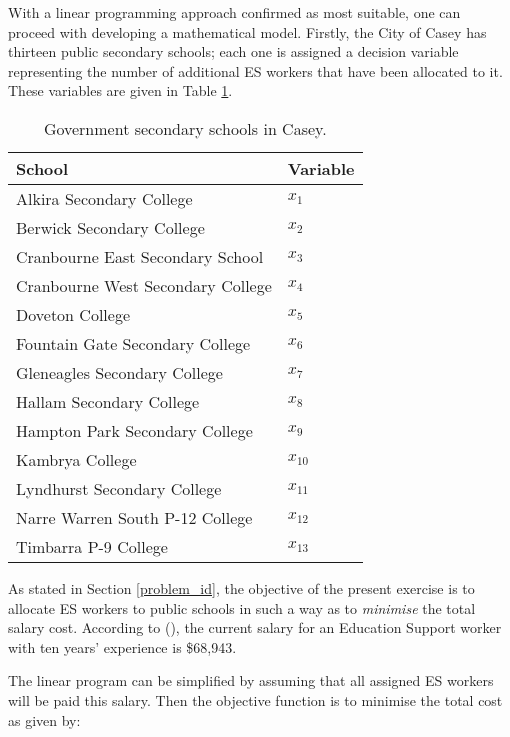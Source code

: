 \documentclass[11pt, a4paper]{article}
\begin{document}
    With a linear programming approach confirmed as most suitable, one can proceed with developing a mathematical model. Firstly, the City of Casey has thirteen public secondary schools; each one is assigned a decision variable representing the number of additional ES workers that have been allocated to it. These variables are given in Table \ref{dec_vars}.

    \begin{table}[!ht]
        \centering
        \caption{Government secondary schools in Casey.}
        \begin{tabular}{|l|l|}
            \hline
            School & Variable \\ \hline
            Alkira Secondary College & $x_1$ \\ \hline
            Berwick Secondary College & $x_2$ \\ \hline
            Cranbourne East Secondary School & $x_3$ \\ \hline
            Cranbourne West Secondary College & $x_4$ \\ \hline
            Doveton College & $x_5$ \\ \hline
            Fountain Gate Secondary College & $x_6$ \\ \hline
            Gleneagles Secondary College & $x_7$ \\ \hline
            Hallam Secondary College & $x_8$ \\ \hline
            Hampton Park Secondary College & $x_9$ \\ \hline
            Kambrya College & $x_{10}$ \\ \hline
            Lyndhurst Secondary College & $x_{11}$ \\ \hline
            Narre Warren South P-12 College & $x_{12}$ \\ \hline
            Timbarra P-9 College & $x_{13}$ \\ \hline
        \end{tabular}
        \label{dec_vars}
    \end{table}
    
    As stated in Section \ref{problem_id}, the objective of the present exercise is to allocate ES workers to public schools in such a way as to \textit{minimise} the total salary cost. According to  (), the current salary for an Education Support worker with ten years' experience is \$68,943.

    The linear program can be simplified by assuming that all assigned ES workers will be paid this salary. Then the objective function is to minimise the total cost as given by:
\end{document}
